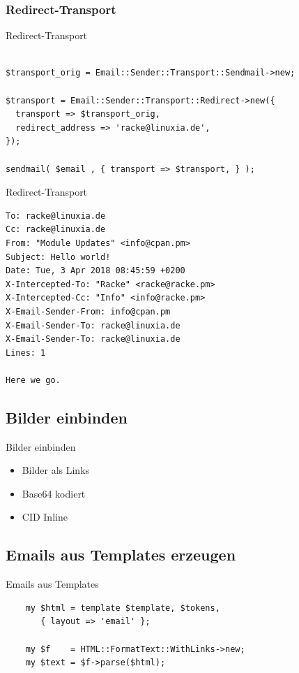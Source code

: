 \subsubsection{Redirect-Transport}

\begin{frame}[fragile]{Redirect-Transport}
  \begin{verbatim}

$transport_orig = Email::Sender::Transport::Sendmail->new;

$transport = Email::Sender::Transport::Redirect->new({
  transport => $transport_orig,
  redirect_address => 'racke@linuxia.de',
});

sendmail( $email , { transport => $transport, } );

\end{verbatim}
\end{frame}

\begin{frame}[fragile]{Redirect-Transport}
\begin{lstlisting}
To: racke@linuxia.de
Cc: racke@linuxia.de
From: "Module Updates" <info@cpan.pm>
Subject: Hello world!
Date: Tue, 3 Apr 2018 08:45:59 +0200
X-Intercepted-To: "Racke" <racke@racke.pm>
X-Intercepted-Cc: "Info" <info@racke.pm>
X-Email-Sender-From: info@cpan.pm
X-Email-Sender-To: racke@linuxia.de
X-Email-Sender-To: racke@linuxia.de
Lines: 1

Here we go.
\end{lstlisting}
\end{frame}

\subsection{Bilder einbinden}

\begin{frame}{Bilder einbinden}
  \begin{itemize}
  \item Bilder als Links
  \item Base64 kodiert
  \item CID Inline
  \end{itemize}
\end{frame}


\subsection{Emails aus Templates erzeugen}

\begin{frame}[fragile]{Emails aus Templates}
  \begin{verbatim}
    my $html = template $template, $tokens,
       { layout => 'email' };

    my $f    = HTML::FormatText::WithLinks->new;
    my $text = $f->parse($html);
  \end{verbatim}
\end{frame}

